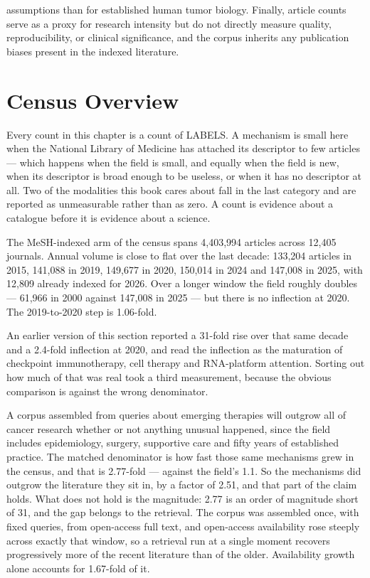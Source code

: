 \documentclass[11pt,twoside,openright]{report}
\begin{document}
assumptions than for established human tumor biology. Finally, article counts serve as a proxy for research intensity but do not directly measure quality, reproducibility, or clinical significance, and the corpus inherits any publication biases present in the indexed literature.
\dinkus
\section{Census Overview}

\begin{refusal}
Every count in this chapter is a count of LABELS. A mechanism is small here when the National Library of Medicine has attached its descriptor to few articles --- which happens when the field is small, and equally when the field is new, when its descriptor is broad enough to be useless, or when it has no descriptor at all. Two of the modalities this book cares about fall in the last category and are reported as unmeasurable rather than as zero. A count is evidence about a catalogue before it is evidence about a science.
\end{refusal}

The MeSH-indexed arm of the census spans 4,403,994 articles across 12,405 journals. Annual volume is close to flat over the last decade: 133,204 articles in 2015, 141,088 in 2019, 149,677 in 2020, 150,014 in 2024 and 147,008 in 2025, with 12,809 already indexed for 2026. Over a longer window the field roughly doubles --- 61,966 in 2000 against 147,008 in 2025 --- but there is no inflection at 2020. The 2019-to-2020 step is 1.06-fold.

An earlier version of this section reported a 31-fold rise over that same decade and a 2.4-fold inflection at 2020, and read the inflection as the maturation of checkpoint immunotherapy, cell therapy and RNA-platform attention. Sorting out how much of that was real took a third measurement, because the obvious comparison is against the wrong denominator.

A corpus assembled from queries about emerging therapies will outgrow all of cancer research whether or not anything unusual happened, since the field includes epidemiology, surgery, supportive care and fifty years of established practice. The matched denominator is how fast those same mechanisms grew in the census, and that is 2.77-fold --- against the field's 1.1. So the mechanisms did outgrow the literature they sit in, by a factor of 2.51, and that part of the claim holds. What does not hold is the magnitude: 2.77 is an order of magnitude short of 31, and the gap belongs to the retrieval. The corpus was assembled once, with fixed queries, from open-access full text, and open-access availability rose steeply across exactly that window, so a retrieval run at a single moment recovers progressively more of the recent literature than of the older. Availability growth alone accounts for 1.67-fold of it.
\end{document}
